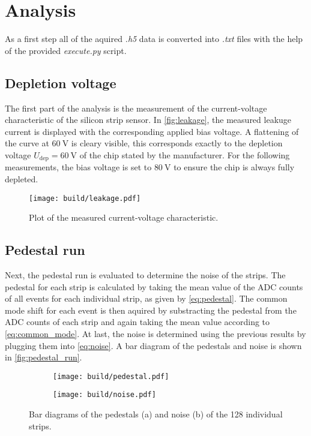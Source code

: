\section{Analysis}
\label{sec:Analysis}

As a first step all of the aquired \textit{.h5} data is converted into \textit{.txt} files with
the help of the provided \textit{execute.py} script.

\subsection{Depletion voltage}

The first part of the analysis is the measurement of the current-voltage characteristic of the
silicon strip sensor. In \autoref{fig:leakage}, the measured leakuge current is displayed with
the corresponding applied bias voltage. A flattening of the curve at $\qty{60}{\volt}$ is cleary
visible, this corresponds exactly to the depletion voltage $U_{\text{dep}}=\qty{60}{\volt}$ of
the chip stated by the manufacturer. For the following measurements, the bias voltage is
set to $\qty{80}{\volt}$ to ensure the chip is always fully depleted.

\begin{figure}[H]
  \centering
  \texttt{[image: build/leakage.pdf]}
  \caption{Plot of the measured current-voltage characteristic.}
  \label{fig:leakage}
\end{figure}

\subsection{Pedestal run}

Next, the pedestal run is evaluated to determine the noise of the strips. The pedestal
for each strip is calculated by taking the mean value of the ADC counts of all events for each individual strip,
as given by \eqref{eq:pedestal}. The common mode shift for each event is then aquired by substracting
the pedestal from the ADC counts of each strip and again taking the mean value according to
\eqref{eq:common_mode}. At last, the noise is determined using the previous results by
plugging them into \eqref{eq:noise}. A bar diagram of the pedestals and noise is shown in
\autoref{fig:pedestal_run}.

\begin{figure}[H]
  \centering
    \begin{subfigure}{0.45\textwidth}
      \texttt{[image: build/pedestal.pdf]}
      \caption{}
      \label{fig:pedestals}
    \end{subfigure}
    \begin{subfigure}{0.45\textwidth}
      \texttt{[image: build/noise.pdf]}
      \caption{}
      \label{fig:noise}
    \end{subfigure} 
  \caption{Bar diagrams of the pedestals (a) and noise (b) of the 128 individual strips.}
  \label{fig:pedestal_run}
\end{figure}

